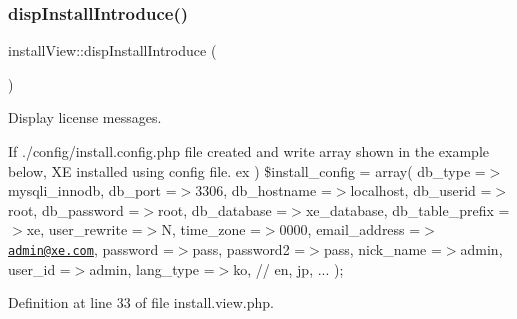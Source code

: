 \subsubsection{\texorpdfstring{disp\+Install\+Introduce()}{dispInstallIntroduce()}}
{\footnotesize\ttfamily install\+View\+::disp\+Install\+Introduce (\begin{DoxyParamCaption}{ }\end{DoxyParamCaption})}



Display license messages. 

If \textquotesingle{}./config/install.config.\+php\textquotesingle{} file created and write array shown in the example below, XE installed using config file. ex ) \$install\+\_\+config = array( \textquotesingle{}db\+\_\+type\textquotesingle{} =$>$\textquotesingle{}mysqli\+\_\+innodb\textquotesingle{}, \textquotesingle{}db\+\_\+port\textquotesingle{} =$>$\textquotesingle{}3306\textquotesingle{}, \textquotesingle{}db\+\_\+hostname\textquotesingle{} =$>$\textquotesingle{}localhost\textquotesingle{}, \textquotesingle{}db\+\_\+userid\textquotesingle{} =$>$\textquotesingle{}root\textquotesingle{}, \textquotesingle{}db\+\_\+password\textquotesingle{} =$>$\textquotesingle{}root\textquotesingle{}, \textquotesingle{}db\+\_\+database\textquotesingle{} =$>$\textquotesingle{}xe\+\_\+database\textquotesingle{}, \textquotesingle{}db\+\_\+table\+\_\+prefix\textquotesingle{} =$>$\textquotesingle{}xe\textquotesingle{}, \textquotesingle{}user\+\_\+rewrite\textquotesingle{} =$>$\textquotesingle{}N\textquotesingle{}, \textquotesingle{}time\+\_\+zone\textquotesingle{} =$>$\textquotesingle{}0000\textquotesingle{}, \textquotesingle{}email\+\_\+address\textquotesingle{} =$>$\textquotesingle{}\href{mailto:admin@xe.com}{\tt admin@xe.\+com}\textquotesingle{}, \textquotesingle{}password\textquotesingle{} =$>$\textquotesingle{}pass\textquotesingle{}, \textquotesingle{}password2\textquotesingle{} =$>$\textquotesingle{}pass\textquotesingle{}, \textquotesingle{}nick\+\_\+name\textquotesingle{} =$>$\textquotesingle{}admin\textquotesingle{}, \textquotesingle{}user\+\_\+id\textquotesingle{} =$>$\textquotesingle{}admin\textquotesingle{}, \textquotesingle{}lang\+\_\+type\textquotesingle{} =$>$\textquotesingle{}ko\textquotesingle{}, // en, jp, ... );

Definition at line 33 of file install.\+view.\+php.

\mbox{\label{classinstallView_a7182430aaf7f9fb4c8e18d21e9e5a4e7}} 
